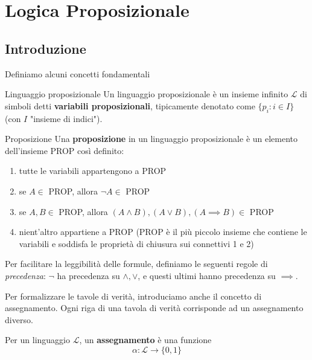 \documentclass[a4paper,12pt]{report}
\begin{document}
\makefrontpage

\tableofcontents

\chapter{Logica Proposizionale}

\section{Introduzione}

Definiamo alcuni concetti fondamentali

\begin{defbox}{Linguaggio proposizionale}{}
    Un linguaggio proposizionale è un insieme infinito \( \mathcal{L} \) di simboli detti \textbf{variabili proposizionali}, tipicamente denotato come \( \{p_i : i \in I\} \) {\color{gray} (con \( I \) "insieme di indici")}.
\end{defbox}

\begin{defbox}{Proposizione}{}
    Una \textbf{proposizione} in un linguaggio proposizionale è un elemento dell'insieme PROP così definito:
    \begin{enumerate}
        \item tutte le variabili appartengono a PROP
        \item se \( A \in \) PROP, allora \( \neg A \in \) PROP
        \item se \( A, B \in \) PROP, allora \( (A \land B), (A \lor B), (A \implies B) \in \) PROP
        \item nient'altro appartiene a PROP {\color{gray}(PROP è il più piccolo insieme che contiene le variabili e soddisfa le proprietà di chiusura sui connettivi 1 e 2)}
    \end{enumerate}
\end{defbox}

Per facilitare la leggibilità delle formule, definiamo le seguenti regole di \textit{precedenza}: \( \neg \) ha precedenza su \( \land, \lor \), e questi ultimi hanno precedenza su \( \implies \).


Per formalizzare le tavole di verità, introduciamo anche il concetto di assegnamento. Ogni riga di una tavola di verità corrisponde ad un assegnamento diverso.

    Per un linguaggio \( \mathcal{L} \), un \textbf{assegnamento} è una funzione 
    \[
        \alpha : \mathcal{L} \to \{0, 1\}
    \]
\end{document}

